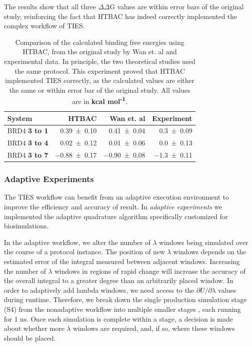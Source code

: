 The results show that all three $\Delta \Delta$G values are within error bars
of the original study, reinforcing the fact that HTBAC has indeed correctly
implemented the complex workflow of TIES.

\begin{table}
  \centering
  \caption{Comparison of the calculated binding free energies using HTBAC,
  from the original study by Wan et. al and experimental data. In principle,
  the two theoretical studies used the same protocol. This experiment proved
  that HTBAC implemented TIES correctly, as the calculated values are either
  the same or within error bar of the original study. All values are in
  \textbf{kcal mol\textsuperscript{-1}}.}
  \begin{tabular}{lrrr}
    \toprule
    System & HTBAC & Wan et. al & Experiment \\
    \midrule
    BRD4 \textbf{3 to 1} & \num{0.39 +- 0.10} &   \num{0.41 +- 0.04} &  \num{0.3 +- 0.09} \\
    BRD4 \textbf{3 to 4} & \num{0.02 +- 0.12} &   \num{0.01 +- 0.06} &  \num{0.0 +- 0.13} \\
    BRD4 \textbf{3 to 7} & \num{-0.88 +- 0.17} &  \num{-0.90 +- 0.08} & \num{-1.3 +- 0.11} \\
    \bottomrule
  \end{tabular}
  \label{tab:exp2}
\end{table}

\subsubsection{Adaptive Experiments}

The TIES workflow can benefit from an adaptive execution environment to
improve the efficiency and accuracy of result. In \emph{adaptive experiments}
we implemented the adaptive quadrature algorithm specifically customized for
biosimulations.

In the adaptive workflow, we alter the number of $\lambda$ windows being
simulated over the course of a protocol instance. The position of new
$\lambda$ windows depends on the estimated error of the integral measured
between adjacent windows. Increasing the number of $\lambda$ windows in
regions of rapid change will increase the accuracy of the overall integral to
a greater degree than an arbitrarily placed window. In order to adaptively
add lambda windows, we need access to the $\partial U/\partial\lambda$ values
during runtime. Therefore, we break down the single production simulation
stage (S4)  from the nonadaptive workflow into multiple smaller stages , each running for 1 ns. Once each simulation is complete within a
stage, a decision is made about whether more $\lambda$ windows are required,
and, if so, where these windows should be placed.

